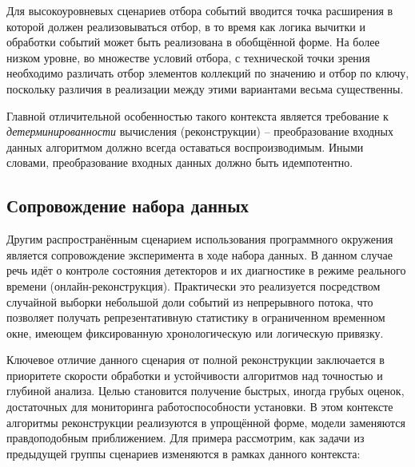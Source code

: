 Для высокоуровневых сценариев отбора событий вводится точка расширения
в которой должен реализовываться отбор, в то время как логика
вычитки и обработки событий может быть реализована в обобщённой
форме. На более низком уровне, во множестве условий отбора, с технической
точки зрения необходимо различать отбор элементов коллекций по
значению и отбор по ключу, поскольку различия в реализации между этими
вариантами весьма существенны.

Главной отличительной особенностью такого контекста является требование к
\emph{детерминированности} вычисления (реконструкции) --
преобразование входных данных алгоритмом должно всегда
оставаться воспроизводимым. Иными словами, преобразование
входных данных должно быть идемпотентно.

\subsection{Сопровождение набора данных}

Другим распространённым сценарием использования программного
окружения является сопровождение эксперимента в ходе набора данных.
В данном случае речь идёт о контроле состояния детекторов и их
диагностике в режиме реального времени (онлайн-реконструкция).
Практически это реализуется посредством случайной выборки небольшой
доли событий из непрерывного потока, что позволяет получать
репрезентативную статистику в ограниченном временном окне, имеющем
фиксированную хронологическую или логическую привязку.

Ключевое отличие данного сценария от полной реконструкции заключается
в приоритете скорости обработки и устойчивости алгоритмов над
точностью и глубиной анализа. Целью становится получение быстрых,
иногда грубых оценок, достаточных для мониторинга работоспособности
установки. В этом контексте алгоритмы реконструкции реализуются в
упрощённой форме, модели заменяются правдоподобным приближением.
Для примера рассмотрим, как задачи из предыдущей группы сценариев
изменяются в рамках данного контекста:

